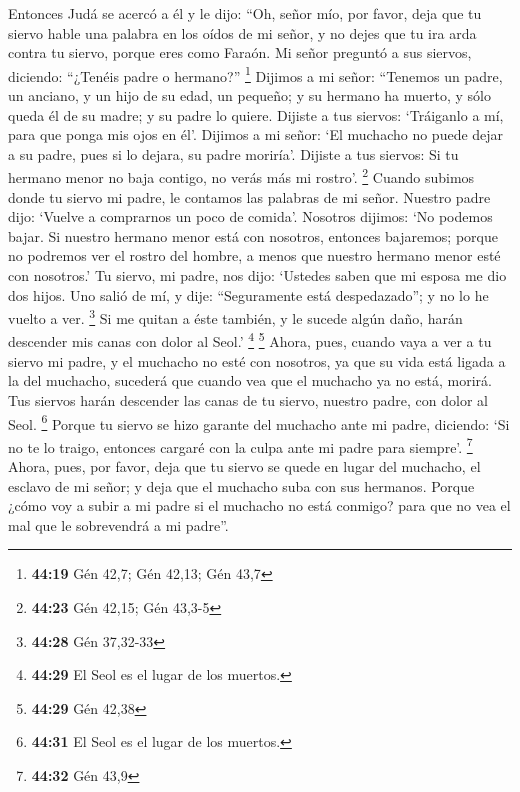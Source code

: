  Entonces Judá se acercó a él y le dijo: ``Oh, señor mío,
por favor, deja que tu siervo hable una palabra en los oídos de mi
señor, y no dejes que tu ira arda contra tu siervo, porque eres como
Faraón.  Mi señor preguntó a sus siervos, diciendo:
``¿Tenéis padre o hermano?'' \footnote{\textbf{44:19} Gén 42,7; Gén
  42,13; Gén 43,7}  Dijimos a mi señor: ``Tenemos un
padre, un anciano, y un hijo de su edad, un pequeño; y su hermano ha
muerto, y sólo queda él de su madre; y su padre lo quiere.
 Dijiste a tus siervos: `Tráiganlo a mí, para que ponga
mis ojos en él'.  Dijimos a mi señor: `El muchacho no
puede dejar a su padre, pues si lo dejara, su padre moriría'.
 Dijiste a tus siervos: Si tu hermano menor no baja
contigo, no verás más mi rostro'. \footnote{\textbf{44:23} Gén 42,15;
  Gén 43,3-5}  Cuando subimos donde tu siervo mi padre,
le contamos las palabras de mi señor.  Nuestro padre
dijo: `Vuelve a comprarnos un poco de comida'.  Nosotros
dijimos: `No podemos bajar. Si nuestro hermano menor está con nosotros,
entonces bajaremos; porque no podremos ver el rostro del hombre, a menos
que nuestro hermano menor esté con nosotros.'  Tu siervo,
mi padre, nos dijo: `Ustedes saben que mi esposa me dio dos hijos.
 Uno salió de mí, y dije: ``Seguramente está
despedazado''; y no lo he vuelto a ver. \footnote{\textbf{44:28} Gén
  37,32-33}  Si me quitan a éste también, y le sucede
algún daño, harán descender mis canas con dolor al Seol.' \footnote{\textbf{44:29}
  El Seol es el lugar de los muertos.} \footnote{\textbf{44:29} Gén
  42,38}  Ahora, pues, cuando vaya a ver a tu siervo mi
padre, y el muchacho no esté con nosotros, ya que su vida está ligada a
la del muchacho,  sucederá que cuando vea que el muchacho
ya no está, morirá. Tus siervos harán descender las canas de tu siervo,
nuestro padre, con dolor al Seol. \footnote{\textbf{44:31} El Seol es el
  lugar de los muertos.}  Porque tu siervo se hizo
garante del muchacho ante mi padre, diciendo: `Si no te lo traigo,
entonces cargaré con la culpa ante mi padre para siempre'. \footnote{\textbf{44:32}
  Gén 43,9}  Ahora, pues, por favor, deja que tu siervo
se quede en lugar del muchacho, el esclavo de mi señor; y deja que el
muchacho suba con sus hermanos.  Porque ¿cómo voy a subir
a mi padre si el muchacho no está conmigo? para que no vea el mal que le
sobrevendrá a mi padre''.

